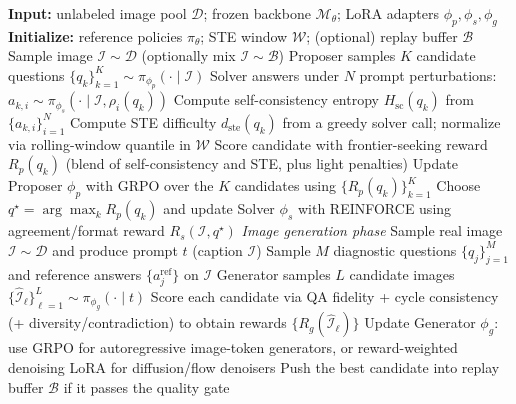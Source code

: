 \documentclass[runningheads]{llncs}
\begin{document}
\begin{algorithm}[!htb]
  \caption{Self-evolving UUG training with coupled visual understanding and image generation loops. The algorithm alternates between question proposal/answering and reward-driven generation updates while keeping the backbone frozen and training only the three LoRA role adapters.}
  \label{alg:self_evolving}
  \small
  \begin{algorithmic}[1]
    \STATE \textbf{Input:} unlabeled image pool $\mathcal{D}$; frozen backbone $\mathcal{M}_\theta$; LoRA adapters $\phi_p,\phi_s,\phi_g$
    \STATE \textbf{Initialize:} reference policies $\pi_{\theta}$; STE window $\mathcal{W}$; (optional) replay buffer $\mathcal{B}$
        \STATE Sample image $\mathcal{I}\sim\mathcal{D}$ (optionally mix $\mathcal{I}\sim\mathcal{B}$)
        \STATE Proposer samples $K$ candidate questions $\{q_k\}_{k=1}^K \sim \pi_{\phi_p}(\cdot\mid\mathcal{I})$
          \STATE Solver answers under $N$ prompt perturbations: $a_{k,i}\sim\pi_{\phi_s}(\cdot\mid\mathcal{I},\rho_i(q_k))$
          \STATE Compute self-consistency entropy $H_{\text{sc}}(q_k)$ from $\{a_{k,i}\}_{i=1}^N$
          \STATE Compute STE difficulty $d_{\text{ste}}(q_k)$ from a greedy solver call; normalize via rolling-window quantile in $\mathcal{W}$
          \STATE Score candidate with frontier-seeking reward $R_p(q_k)$ (blend of self-consistency and STE, plus light penalties)
        \ENDFOR
        \STATE Update Proposer $\phi_p$ with GRPO over the $K$ candidates using $\{R_p(q_k)\}_{k=1}^K$ \cite{shao2024deepseekmath}
        \STATE Choose $q^\star=\arg\max_k R_p(q_k)$ and update Solver $\phi_s$ with REINFORCE using agreement/format reward $R_s(\mathcal{I},q^\star)$
      \ELSE
        \STATE \textit{Image generation phase}
        \STATE Sample real image $\mathcal{I}\sim\mathcal{D}$ and produce prompt $t$ (caption $\mathcal{I}$)
        \STATE Sample $M$ diagnostic questions $\{q_j\}_{j=1}^M$ and reference answers $\{a_j^{\text{ref}}\}$ on $\mathcal{I}$
        \STATE Generator samples $L$ candidate images $\{\hat{\mathcal{I}}_\ell\}_{\ell=1}^L \sim \pi_{\phi_g}(\cdot\mid t)$
        \STATE Score each candidate via QA fidelity + cycle consistency (+ diversity/contradiction) to obtain rewards $\{R_g(\hat{\mathcal{I}}_\ell)\}$
        \STATE Update Generator $\phi_g$: use GRPO for autoregressive image-token generators, or reward-weighted denoising LoRA for diffusion/flow denoisers
        \STATE Push the best candidate into replay buffer $\mathcal{B}$ if it passes the quality gate
      \ENDIF
    \ENDFOR
  \end{algorithmic}
\end{algorithm}
\end{document}
